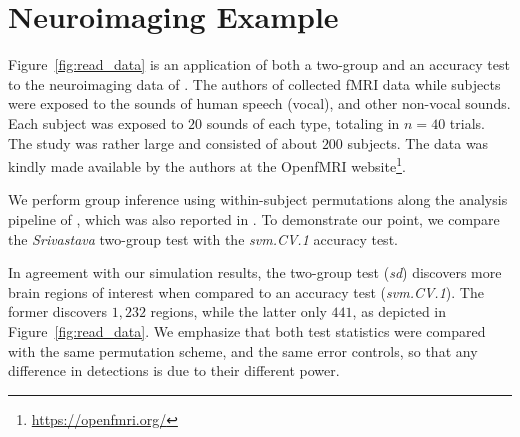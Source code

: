 \documentclass[journal]{IEEEtran}
\begin{document}
\section{Neuroimaging Example}
\label{sec:example}

Figure~\ref{fig:read_data} is an application of both a two-group and an accuracy test to the neuroimaging data of \cite{pernet_human_2015}. 
The authors of \cite{pernet_human_2015} collected fMRI data while subjects were exposed to the sounds of human speech (vocal), and other non-vocal sounds. 
Each subject was exposed to $20$ sounds of each type, totaling in $n=40$ trials.
The study was rather large and consisted of about $200$ subjects.
The data was kindly made available by the authors at the OpenfMRI website\footnote{\url{https://openfmri.org/}}.

We perform group inference using within-subject permutations along the analysis pipeline of \cite{stelzer_statistical_2013}, which was also reported in \cite{gilron_quantifying_2016}. 
To demonstrate our point, we compare the \emph{Srivastava} two-group test with the \emph{svm.CV.1} accuracy test. 

In agreement with our simulation results, the two-group test (\emph{sd}) discovers more brain regions of interest when compared to an accuracy test (\emph{svm.CV.1}).
The former discovers $1,232$ regions, while the latter only $441$, as depicted in Figure~\ref{fig:read_data}.
We emphasize that both test statistics were compared with the same permutation scheme, and the same error controls, so that any difference in detections is due to their different power.
\end{document}
